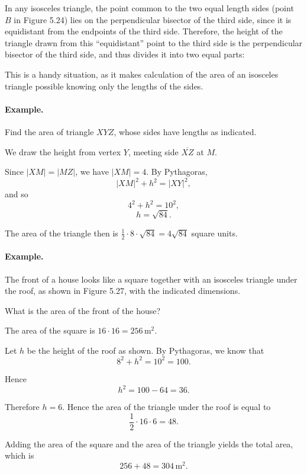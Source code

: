 \documentclass[12pt]{book} %
\begin{document}

In any isosceles triangle, the point common to the two equal length sides (point $B$ in Figure 5.24) lies on the perpendicular bisector of the third side, since it is equidistant from the endpoints of the third side. Therefore, the height of the triangle drawn from this ``equidistant'' point to the third side is the perpendicular bisector of the third side, and thus divides it into two equal parts:


This is a handy situation, as it makes calculation of the area of an isosceles triangle possible knowing only the lengths of the sides.

\paragraph{Example.}
Find the area of triangle $XYZ$, whose sides have lengths as indicated.


We draw the height from vertex $Y$, meeting side $\overline{XZ}$ at $M$.


Since $|XM|=|MZ|$, we have $|XM|=4$. By Pythagoras,
\[
|XM|^2+h^2=|XY|^2,
\]
and so
\[
4^2+h^2=10^2,
\]
\[
h=\sqrt{84}.
\]

The area of the triangle then is $\frac12\cdot 8\cdot \sqrt{84}=4\sqrt{84}$ square units.

\paragraph{Example.}
The front of a house looks like a square together with an isosceles triangle under the roof, as shown in Figure 5.27, with the indicated dimensions.


What is the area of the front of the house?

The area of the square is $16\cdot 16=256\,\text{m}^2$.

Let $h$ be the height of the roof as shown. By Pythagoras, we know that
\[
8^2+h^2=10^2=100.
\]

Hence
\[
h^2=100-64=36.
\]

Therefore $h=6$. Hence the area of the triangle under the roof is equal to
\[
\frac12\cdot 16\cdot 6=48.
\]

Adding the area of the square and the area of the triangle yields the total area, which is
\[
256+48=304\,\text{m}^2.
\]
\end{document}
